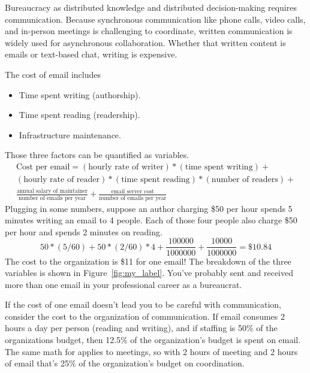 Bureaucracy as distributed knowledge and distributed decision-making requires communication. Because synchronous communication like phone calls, video calls, and in-person meetings is challenging to coordinate, written communication is widely used for asynchronous collaboration. Whether that written content is emails or text-based chat, writing is expensive.

The cost of email includes
\begin{itemize}
    \item Time spent writing (authorship).
    \item Time spent reading (readership).
    \item Infrastructure maintenance.
\end{itemize}

Those three factors can be quantified as variables. 
\begin{multline}
\text{Cost per email} = 
(\text{hourly rate of writer})*(\text{time spent writing}) +\\
(\text{hourly rate of reader})*(\text{time spent reading})*(\text{number of readers})+\\
\frac{\text{annual salary of maintainer}}{\text{number of emails per year}} + \frac{\text{email server cost}}{\text{number of emails per year}}
\end{multline}
Plugging in some numbers, suppose an author charging \$50 per hour spends 5 minutes writing an email to 4 people. Each of those four people also charge \$50 per hour and spends 2 minutes on reading. 
\begin{equation}
50*(5/60) + 50*(2/60)*4 + \frac{100000}{1000000} + \frac{10000}{1000000} = \$10.84
\label{eq:four_readers}
\end{equation}
The cost to the organization is \$11 for one email! The breakdown of the three variables is shown in Figure~\ref{fig:my_label}. You've probably sent and received more than one email in your professional career as a bureaucrat. 


If the cost of one email doesn't lead you to be careful with communication, consider the cost to the organization of communication. If email consumes 2 hours a day per person (reading and writing), and if staffing is 50\% of the organizations budget, then 
12.5\% of the organization's budget is spent on email. The same math for applies to meetings, so with 2 hours of meeting and 2 hours of email that's 25\% of the organization's budget on coordination.

